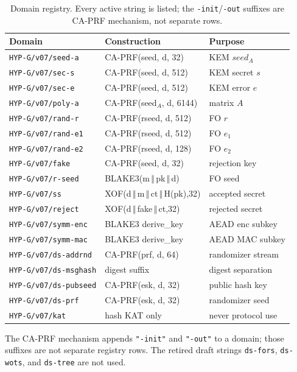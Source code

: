 \documentclass[11pt,a4paper]{article}
\theoremstyle{plain}
\theoremstyle{definition}
\theoremstyle{remark}
\newcommand{\concat}{\,\Vert\,}
\begin{document}
\begin{longtable}{@{}lll@{}}
\caption{Domain registry.  Every active string is listed; the
\texttt{-init}/\texttt{-out} suffixes are CA-PRF mechanism, not
separate rows.}\label{tab:domains}\\
\toprule
Domain & Construction & Purpose \\
\midrule
\endhead
\texttt{HYP-G/v07/seed-a} & CA-PRF(seed, d, 32) & KEM $\mathit{seed}_A$ \\
\texttt{HYP-G/v07/sec-s} & CA-PRF(seed, d, 512) & KEM secret $s$ \\
\texttt{HYP-G/v07/sec-e} & CA-PRF(seed, d, 512) & KEM error $e$ \\
\texttt{HYP-G/v07/poly-a} & CA-PRF(seed$_A$, d, 6144) & matrix $A$ \\
\texttt{HYP-G/v07/rand-r} & CA-PRF(rseed, d, 512) & FO $r$ \\
\texttt{HYP-G/v07/rand-e1} & CA-PRF(rseed, d, 512) & FO $e_1$ \\
\texttt{HYP-G/v07/rand-e2} & CA-PRF(rseed, d, 128) & FO $e_2$ \\
\texttt{HYP-G/v07/fake} & CA-PRF(seed, d, 32) & rejection key \\
\texttt{HYP-G/v07/r-seed} & BLAKE3(m$\concat$pk$\concat$d) & FO seed \\
\texttt{HYP-G/v07/ss} & XOF(d$\concat$m$\concat$ct$\concat$H(pk),32) & accepted secret \\
\texttt{HYP-G/v07/reject} & XOF(d$\concat$fake$\concat$ct,32) & rejected secret \\
\texttt{HYP-G/v07/symm-enc} & BLAKE3 derive\_key & AEAD enc subkey \\
\texttt{HYP-G/v07/symm-mac} & BLAKE3 derive\_key & AEAD MAC subkey \\
\texttt{HYP-G/v07/ds-addrnd} & CA-PRF(prf, d, 64) & randomizer stream \\
\texttt{HYP-G/v07/ds-msghash} & digest suffix & digest separation \\
\texttt{HYP-G/v07/ds-pubseed} & CA-PRF(esk, d, 32) & public hash key \\
\texttt{HYP-G/v07/ds-prf} & CA-PRF(esk, d, 32) & randomizer seed \\
\texttt{HYP-G/v07/kat} & hash KAT only & never protocol use \\
\bottomrule
\end{longtable}

The CA-PRF mechanism appends \texttt{"-init"} and \texttt{"-out"} to a
domain; those suffixes are not separate registry rows.  The retired
draft strings \texttt{ds-fors}, \texttt{ds-wots}, and \texttt{ds-tree}
are not used.
\end{document}
